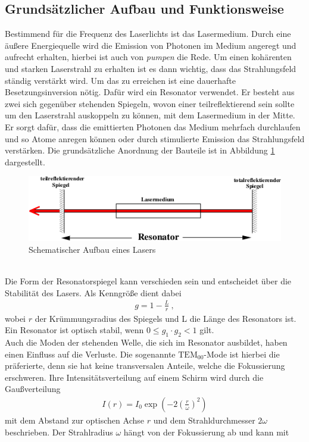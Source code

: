 \subsection{Grundsätzlicher Aufbau und Funktionsweise}
Bestimmend für die Frequenz des Laserlichts ist das Lasermedium. Durch eine äußere Energiequelle wird die Emission von Photonen im Medium angeregt und aufrecht erhalten, hierbei ist auch von \textit{pumpen} die Rede. Um einen kohärenten und starken Laserstrahl zu erhalten ist es dann wichtig, dass das Strahlungsfeld ständig verstärkt wird. Um das zu erreichen ist eine dauerhafte Besetzungsinversion nötig. Dafür wird ein Resonator verwendet. Er besteht aus zwei sich gegenüber stehenden Spiegeln, wovon einer teilreflektierend sein sollte um den Laserstrahl auskoppeln zu können, mit dem Lasermedium in der Mitte. Er sorgt dafür, dass die emittierten Photonen das Medium mehrfach durchlaufen und so Atome anregen können oder durch stimulierte Emission das Strahlungsfeld verstärken. Die grundsätzliche Anordnung der Bauteile ist in Abbildung \ref{fig:BasicLaser} dargestellt.
\begin{figure}[h!]
	\centering
	\includegraphics[width=.6\textwidth]{BasicAufbau.png}
	\caption{Schematischer Aufbau eines Lasers \cite{V61}}
	\label{fig:BasicLaser}
\end{figure} \\
Die Form der Resonatorspiegel kann verschieden sein und entscheidet über die Stabilität des Lasers. Als Kenngröße dient dabei
\begin{align}
	g = 1-\frac{L}{r} \ ,
\end{align}
wobei $r$ der Krümmungsradius des Spiegels  und L die Länge des Resonators ist. Ein Resonator ist optisch stabil, wenn $ 0\leq g_1\cdot g_2<1$ gilt. \\
Auch die Moden der stehenden Welle, die sich im Resonator ausbildet, haben einen Einfluss auf die Verluste. Die sogenannte $\text{TEM}_{00}$-Mode ist hierbei die präferierte, denn sie hat keine transversalen Anteile, welche die Fokussierung erschweren. Ihre Intensitätsverteilung auf einem Schirm wird durch die Gaußverteilung
\begin{align}
	I(r) = I_0\exp\left(-2\left(\frac{r}{\omega}\right)^2\right)
\end{align}
mit dem Abstand zur optischen Achse $r$ und dem Strahldurchmesser $2\omega$ beschrieben. Der Strahlradius $\omega$ hängt von der Fokussierung ab und kann mit

